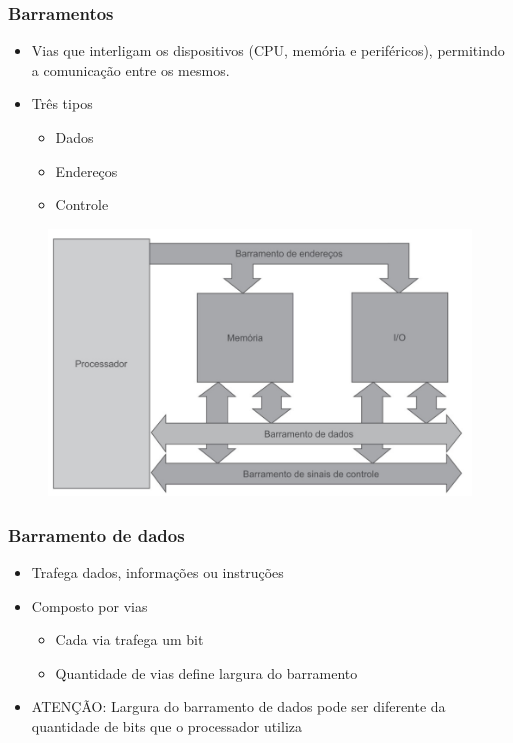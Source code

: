 \documentclass[aspectratio=169,
				xcolor=table]{beamer}
\begin{document}
	\begin{frame}
		\frametitle{Barramentos}
		\begin{itemize}
			\item Vias que interligam os dispositivos (CPU, memória e periféricos), permitindo a comunicação entre os mesmos.
			\vspace{1em}
			\item Três tipos
			\begin{itemize}
				\item Dados
				\item Endereços
				\item Controle
			\end{itemize}
		\end{itemize}
		\begin{flushright}
		\begin{minipage}{0.7\textwidth}
			\vspace{-2.5cm}
			\begin{figure}
				\includegraphics[width=.65\textwidth, keepaspectratio]{../figs/cap05/barramento.png}
			\end{figure}		
		\end{minipage}
		\end{flushright}
	\end{frame}
	
	\begin{frame}
		\frametitle{Barramento de dados}
		
		\begin{itemize}
			\item Trafega dados, informações ou instruções 
			\vspace{1em}
			\item Composto por vias
			\begin{itemize}
				\item Cada via trafega um bit
				\item Quantidade de vias define largura do barramento

			\end{itemize}
			\vspace{1em}
			
			\item \alert{ATENÇÃO: Largura do barramento de dados pode ser diferente da quantidade de bits que o processador utiliza} 			

		\end{itemize}
	\end{frame}
	
\end{document}
